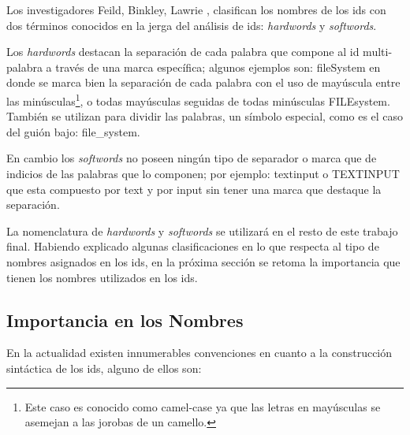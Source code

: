 Los investigadores Feild, Binkley, Lawrie \cite{FBL06,HDD06,DMDJ13}, clasifican los nombres de los ids con dos términos conocidos en la jerga del análisis de ids: \textit{hardwords} y \textit{softwords}.

Los \textit{hardwords} destacan la separación de cada palabra que compone al id multi-palabra a través de una marca específica; algunos ejemplos son: \mbox{\textsf{fileSystem}} en donde se marca bien la separación de cada palabra con el uso de mayúscula entre las minúsculas\footnote[1]{Este caso es conocido como camel-case ya que las letras en mayúsculas se asemejan a las jorobas de un camello.}, o todas mayúsculas seguidas de todas minúsculas \mbox{\textsf{FILEsystem}}. También se utilizan para dividir las palabras, un símbolo especial, como es el caso del guión bajo: \textsf{file\_system}. 

En cambio los \textit{softwords} no poseen ningún tipo de separador o marca que de indicios de las palabras que lo componen; por ejemplo: \textsf{textinput} o \mbox{\textsf{TEXTINPUT}} que esta compuesto por \textsf{text} y por \textsf{input} sin tener una marca que destaque la separación.

La nomenclatura de \textit{hardwords} y \textit{softwords} se utilizará en el resto de este trabajo final. Habiendo explicado algunas clasificaciones en lo que respecta al tipo de nombres asignados en los ids, en la próxima sección se retoma la importancia que tienen los nombres utilizados en los ids.




\subsection{Importancia en los Nombres}
En la actualidad existen innumerables convenciones en cuanto a la construcción sintáctica de los ids, alguno de ellos son:


